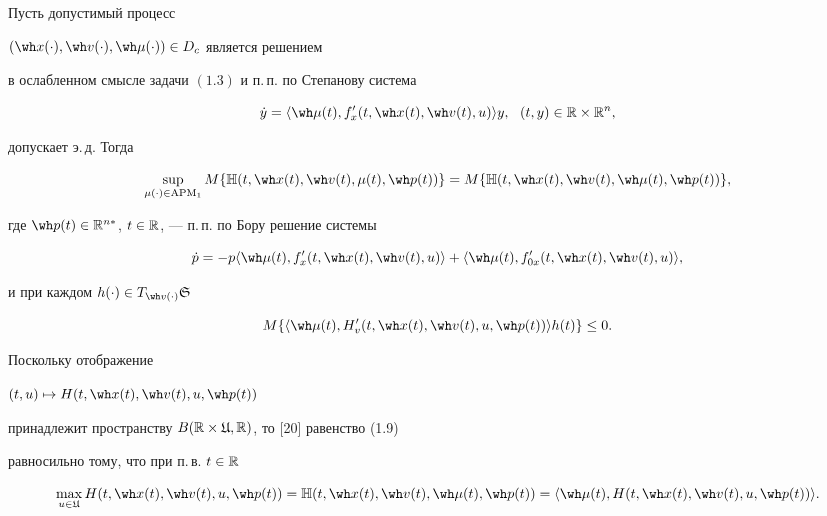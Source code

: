 \begin{thms}


Пусть допустимый процесс


$(\wh x(\cdot),\wh v(\cdot),\wh\mu(\cdot))\in D_{c}$ является решением


в ослабленном смысле задачи $(1.3)$ и п.\,п. по Степанову система


\begin{equation}


\Dot y=\la\wh\mu(t),f'_{x}(t,\wh x(t),\wh v(t),u)\ra y,\ \


(t,y)\in\R\times\R^{n},


\end{equation}


допускает э.\,д. Тогда


\begin{equation}


\sup_{\mu(\cdot)\in \APM_{1}}


M\{\Bbb H(t,\wh x(t),\wh v(t),\mu(t),\wh p(t))\}=


M\{\Bbb H(t,\wh x(t),\wh v(t),\wh\mu(t),\wh p(t))\},


\end{equation}


где $\wh p(t)\in\R^{n*}$, $t\in\Bbb R$, --- п.\,п. по Бору решение системы


\begin{equation}


\Dot p=-p\la\wh\mu(t),f'_{x}(t,\wh x(t),\wh v(t),u)\ra+


\la\wh\mu(t),f'_{0x}(t,\wh x(t),\wh v(t),u)\ra,


\end{equation}


и при каждом $h(\cdot)\in T_{\wh v(\cdot)}\gS$


\begin{equation}


M\{\la\wh\mu(t),H'_{v}(t,\wh x(t),\wh v(t),u,\wh p(t))\ra


h(t)\}\le0.


\end{equation}


\end{thms}





\begin{notes}


Поскольку отображение


$(t,u)\mapsto H(t,\wh x(t),\wh v(t),u,\wh p(t))$


принадлежит пространству $B(\Bbb R\times\frak U,\Bbb R)$, то [20] равенство (1.9)


равносильно тому, что при п.\,в. $t\in\Bbb R$


$$


\max_{u\in\gU}H(t,\wh x(t),\wh v(t),u,\wh p(t))


=\Bbb H(t,\wh x(t),\wh v(t),\wh\mu(t),\wh p(t))=


\la\wh\mu(t),H(t,\wh x(t),\wh v(t),u,\wh p(t))\ra.


$$


\end{notes}





